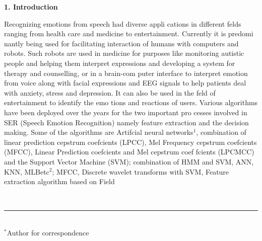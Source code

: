 \documentclass[10pt,a4paper]{article}
\begin{document}
\begin{multicols}{2}
{\Large  \color{tieude} \rmfamily \textbf{1. Introduction}}

{\vspace*{-1pt}
\hspace*{-10pt} Recognizing emotions from speech had diverse appli
cations in different felds ranging from health care and
medicine to entertainment. Currently it is predomi
nantly being used for facilitating interaction of humans
with computers and robots. Such robots are used in
medicine for purposes like monitoring autistic people
and helping them interpret expressions and developing
a system for therapy and counselling, or in a brain-com
puter interface to interpret emotion from voice along
with facial expressions and EEG signals to help patients
deal with anxiety, stress and depression. It can also be
used in the feld of entertainment to identify the emo
tions and reactions of users. Various algorithms have
been deployed over the years for the two important pro
cesses involved in SER (Speech Emotion Recognition)
namely feature extraction and the decision making.
Some of the algorithms are Artifcial neural networks$^1$,
combination of linear prediction cepstrum coefcients
(LPCC), Mel Frequency cepstrum coefcients (MFCC),
Linear Prediction coefcients and Mel cepstrum coef
fcients (LPCMCC) and the Support Vector Machine
(SVM); combination of HMM and SVM, ANN, KNN,
MLBetc$^2$; MFCC, Discrete wavelet transforms with
SVM, Feature extraction algorithm based on Field}
\end{multicols}
{\color{tieude}\ \rule{3cm}{0.1pt}}\\
$^*$Author for correspondence
\end{document}
